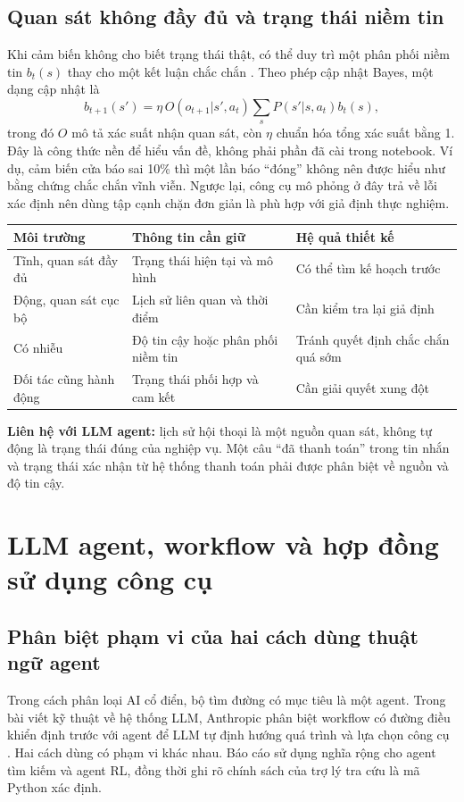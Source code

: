 \subsection{Quan sát không đầy đủ và trạng thái niềm tin}
Khi cảm biến không cho biết trạng thái thật, có thể duy trì một phân phối niềm tin
$b_t(s)$ thay cho một kết luận chắc chắn \cite{pomdp}. Theo phép cập nhật Bayes, một dạng cập nhật là
\[
b_{t+1}(s')=\eta\,O(o_{t+1}|s',a_t)\sum_s P(s'|s,a_t)b_t(s),
\]
trong đó $O$ mô tả xác suất nhận quan sát, còn $\eta$ chuẩn hóa tổng xác suất bằng 1.
Đây là công thức nền để hiểu vấn đề, không phải phần đã cài trong notebook. Ví dụ,
cảm biến cửa báo sai 10\% thì một lần báo ``đóng'' không nên được hiểu như bằng chứng
chắc chắn vĩnh viễn. Ngược lại, công cụ mô phỏng ở đây trả về lỗi xác định nên dùng
tập cạnh chặn đơn giản là phù hợp với giả định thực nghiệm.

\begin{center}\small
\begin{tabularx}{\linewidth}{@{}p{3.3cm}XX@{}}\toprule
\textbf{Môi trường} & \textbf{Thông tin cần giữ} & \textbf{Hệ quả thiết kế}\\\midrule
Tĩnh, quan sát đầy đủ & Trạng thái hiện tại và mô hình & Có thể tìm kế hoạch trước\\
Động, quan sát cục bộ & Lịch sử liên quan và thời điểm & Cần kiểm tra lại giả định\\
Có nhiễu & Độ tin cậy hoặc phân phối niềm tin & Tránh quyết định chắc chắn quá sớm\\
Đối tác cũng hành động & Trạng thái phối hợp và cam kết & Cần giải quyết xung đột\\\bottomrule
\end{tabularx}\end{center}
\textbf{Liên hệ với LLM agent:} lịch sử hội thoại là một nguồn quan sát, không tự động
là trạng thái đúng của nghiệp vụ. Một câu ``đã thanh toán'' trong tin nhắn và trạng
thái xác nhận từ hệ thống thanh toán phải được phân biệt về nguồn và độ tin cậy.

\newpage
\section{LLM agent, workflow và hợp đồng sử dụng công cụ}
\subsection{Phân biệt phạm vi của hai cách dùng thuật ngữ agent}
Trong cách phân loại AI cổ điển, bộ tìm đường có mục tiêu là một agent. Trong bài viết
kỹ thuật về hệ thống LLM, Anthropic phân biệt workflow có đường điều khiển định trước
với agent để LLM tự định hướng quá trình và lựa chọn công cụ \cite{effective}.
Hai cách dùng có phạm vi khác nhau. Báo cáo sử dụng nghĩa rộng cho agent tìm kiếm và
agent RL, đồng thời ghi rõ chính sách của trợ lý tra cứu là mã Python xác định.

